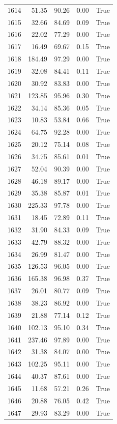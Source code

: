 \begin{longtable}{rrrrr}
1614 & 51.35 & 90.26 & 0.00 & True \\
1615 & 32.66 & 84.69 & 0.09 & True \\
1616 & 22.02 & 77.29 & 0.00 & True \\
1617 & 16.49 & 69.67 & 0.15 & True \\
1618 & 184.49 & 97.29 & 0.00 & True \\
1619 & 32.08 & 84.41 & 0.11 & True \\
1620 & 30.92 & 83.83 & 0.00 & True \\
1621 & 123.85 & 95.96 & 0.30 & True \\
1622 & 34.14 & 85.36 & 0.05 & True \\
1623 & 10.83 & 53.84 & 0.66 & True \\
1624 & 64.75 & 92.28 & 0.00 & True \\
1625 & 20.12 & 75.14 & 0.08 & True \\
1626 & 34.75 & 85.61 & 0.01 & True \\
1627 & 52.04 & 90.39 & 0.00 & True \\
1628 & 46.18 & 89.17 & 0.00 & True \\
1629 & 35.38 & 85.87 & 0.01 & True \\
1630 & 225.33 & 97.78 & 0.00 & True \\
1631 & 18.45 & 72.89 & 0.11 & True \\
1632 & 31.90 & 84.33 & 0.09 & True \\
1633 & 42.79 & 88.32 & 0.00 & True \\
1634 & 26.99 & 81.47 & 0.00 & True \\
1635 & 126.53 & 96.05 & 0.00 & True \\
1636 & 165.38 & 96.98 & 0.37 & True \\
1637 & 26.01 & 80.77 & 0.09 & True \\
1638 & 38.23 & 86.92 & 0.00 & True \\
1639 & 21.88 & 77.14 & 0.12 & True \\
1640 & 102.13 & 95.10 & 0.34 & True \\
1641 & 237.46 & 97.89 & 0.00 & True \\
1642 & 31.38 & 84.07 & 0.00 & True \\
1643 & 102.25 & 95.11 & 0.00 & True \\
1644 & 40.37 & 87.61 & 0.00 & True \\
1645 & 11.68 & 57.21 & 0.26 & True \\
1646 & 20.88 & 76.05 & 0.42 & True \\
1647 & 29.93 & 83.29 & 0.00 & True \\

\end{longtable}
